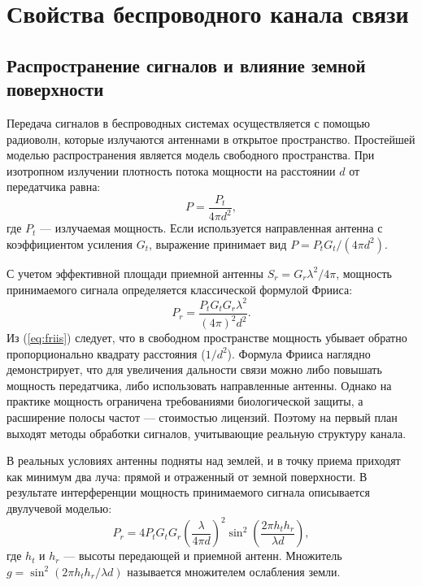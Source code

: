 \clearpage
\section{Свойства беспроводного канала связи}
\label{sec:channel}

\subsection{Распространение сигналов и влияние земной поверхности}

Передача сигналов в беспроводных системах осуществляется с помощью радиоволн, которые излучаются антеннами в открытое пространство. Простейшей моделью распространения является модель свободного пространства. При изотропном излучении плотность потока мощности на расстоянии $d$ от передатчика равна:
\begin{equation}
    P = \frac{P_t}{4\pi d^2},
\end{equation}
где $P_t$ --- излучаемая мощность. Если используется направленная антенна с коэффициентом усиления $G_t$, выражение принимает вид $P = P_t G_t / (4\pi d^2)$. 

С учетом эффективной площади приемной антенны $S_r = G_r \lambda^2 / 4\pi$, мощность принимаемого сигнала определяется классической формулой Фрииса:
\begin{equation}
    P_r = \frac{P_t G_t G_r \lambda^2}{(4\pi)^2 d^2}.
    \label{eq:friis}
\end{equation}
Из (\ref{eq:friis}) следует, что в свободном пространстве мощность убывает обратно пропорционально квадрату расстояния ($1/d^2$). Формула Фрииса наглядно демонстрирует, что для увеличения дальности связи можно либо повышать мощность передатчика, либо использовать направленные антенны. Однако на практике мощность ограничена требованиями биологической защиты, а расширение полосы частот --- стоимостью лицензий. Поэтому на первый план выходят методы обработки сигналов, учитывающие реальную структуру канала\cite{ermolaev2011}.

В реальных условиях антенны подняты над землей, и в точку приема приходят как минимум два луча: прямой и отраженный от земной поверхности. В результате интерференции мощность принимаемого сигнала описывается двулучевой моделью:
\begin{equation}
    P_r = 4P_t G_t G_r \left(\frac{\lambda}{4\pi d}\right)^2 \sin^2\left(\frac{2\pi h_t h_r}{\lambda d}\right),
\end{equation}
где $h_t$ и $h_r$ --- высоты передающей и приемной антенн. Множитель $g = \sin^2(2\pi h_t h_r / \lambda d)$ называется множителем ослабления земли.


